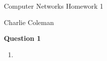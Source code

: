 \documentclass[12pt]{article}
\begin{document}
	\begin{center}
		\begin{large}
			Computer Networks Homework 1
		\end{large}
	\end{center}
	
	\hfill Charlie Coleman
	
	\noindent \textbf{Question 1}
	
	\begin{enumerate}[nolistsep]
		\item 
	\end{enumerate}
\end{document}
